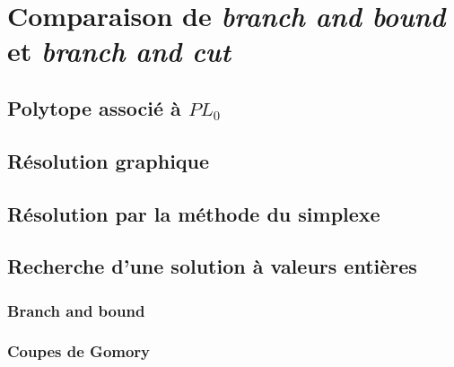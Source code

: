 
\section{Comparaison de \emph{branch and bound} et \emph{branch and cut}}

\subsection{Polytope associé à ${PL}_0$}


\subsection{Résolution graphique}


\subsection{Résolution par la méthode du simplexe}


\subsection{Recherche d'une solution à valeurs entières}

\subsubsection{Branch and bound}

\subsubsection{Coupes de Gomory}